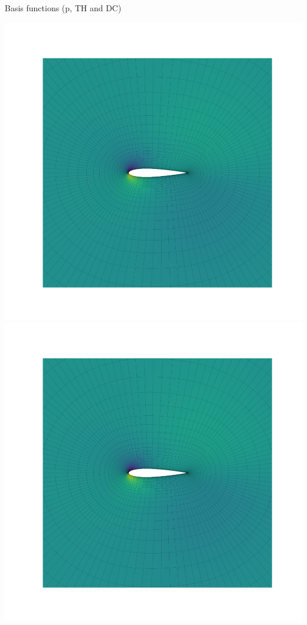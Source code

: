 \documentclass{beamer}
\begin{document}
\begin{frame}{Basis functions (p, TH and DC)}
  \begin{center}
    \includegraphics[trim={35mm 0 40mm 0},clip,height=0.95\textheight]{figs/bfun-p-no-piola-p003}
    \includegraphics[trim={35mm 0 40mm 0},clip,height=0.95\textheight]{figs/bfun-p-piola-p003}
  \end{center}
\end{frame}
\end{document}
